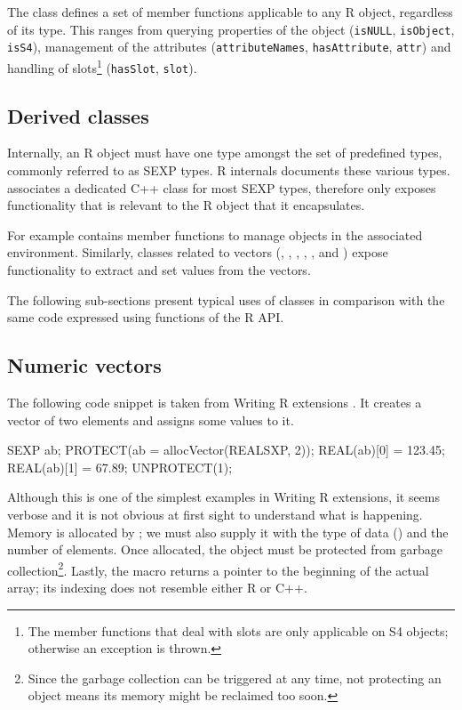The  class defines a set of member functions applicable
to any R object, regardless of its type. This ranges from 
querying properties of the object (\texttt{isNULL}, \texttt{isObject}, 
\texttt{isS4}), management of the attributes 
(\texttt{attributeNames}, \texttt{hasAttribute}, \texttt{attr}) and 
handling of slots\footnote{The member functions that deal with slots
are only applicable on S4 objects; otherwise an exception is thrown.} 
(\texttt{hasSlot}, \texttt{slot}).

\subsection{Derived classes}

Internally, an R object must have one type amongst the set of 
predefined types, commonly referred to as SEXP types. R internals
\citep{R:ints} documents these various types. 
 associates a dedicated C++ class for most SEXP types, 
therefore only exposes functionality that is relevant to the R object
that it encapsulates.

For example  contains 
member functions to manage objects in the associated environment. 
Similarly, classes related to vectors (, , 
, , , 
 and ) expose functionality
to extract and set values from the vectors.

The following sub-sections present typical uses of  classes in
comparison with the same code expressed using functions of the R API.

\subsection{Numeric vectors}

The following code snippet is taken from Writing R extensions
\citep{R:exts}. It creates a  vector of two elements 
and assigns some values to it. 

\begin{example}
SEXP ab;
PROTECT(ab = allocVector(REALSXP, 2));
REAL(ab)[0] = 123.45;
REAL(ab)[1] = 67.89;
UNPROTECT(1);
\end{example}

Although this is one of the simplest examples in Writing R extensions, 
it seems verbose and it is not obvious at first sight to understand what is happening.
Memory is allocated by ; we must also supply it with
the type of data () and the number of elements.  Once
allocated, the  object must be protected from garbage
collection\footnote{Since the garbage collection can be triggered at any time, not
protecting an object means its memory might be reclaimed too soon.}. 
Lastly, the  macro returns a pointer to the
beginning of the actual array; its indexing does not resemble either R or
C++.

